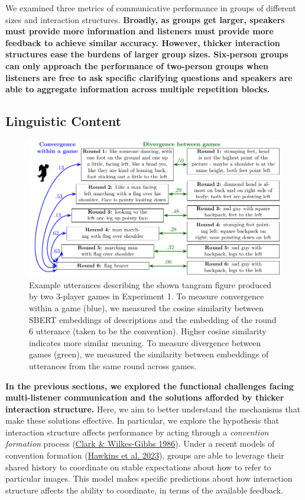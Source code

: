 \documentclass[
  english,
]{article}
\begin{document}
We examined three metrics of communicative performance in groups of different sizes and interaction structures.
\textbf{Broadly, as groups get larger, speakers must provide more information and listeners must provide more feedback to achieve similar accuracy. However, thicker interaction structures ease the burdens of larger group sizes. Six-person groups can only approach the performance of two-person groups when listeners are free to ask specific clarifying questions and speakers are able to aggregate information across multiple repetition blocks.}

\hypertarget{linguistic-content}{%
\subsection{Linguistic Content}\label{linguistic-content}}

\begin{figure}[t!]

{\centering \includegraphics[width=1\linewidth]{sbert} 

}

\caption{Example utterances describing the shown tangram figure produced by two 3-player games in Experiment 1. To measure convergence within a game (blue), we measured the cosine similarity between SBERT embeddings of descriptions and the embedding of the round 6 utterance (taken to be the convention). Higher cosine similarity indicates more similar meaning. To measure divergence between games (green), we measured the similarity between embeddings of utterances from the same round across games.}\label{fig:sbert-diagram}
\end{figure}

\textbf{In the previous sections, we explored the functional challenges facing multi-listener communication and the solutions afforded by thicker interaction structure.}
Here, we aim to better understand the mechanisms that make these solutions effective.
In particular, we explore the hypothesis that interaction structure affects performance by acting through a \emph{convention formation} process (\protect\hyperlink{ref-clark1986}{Clark \& Wilkes-Gibbs 1986}).
Under a recent models of convention formation (\protect\hyperlink{ref-hawkins2023partners}{Hawkins et al. 2023}), groups are able to leverage their shared history to coordinate on stable expectations about how to refer to particular images.
This model makes specific predictions about how interaction structure affects the ability to coordinate, in terms of the available feedback.
\end{document}
